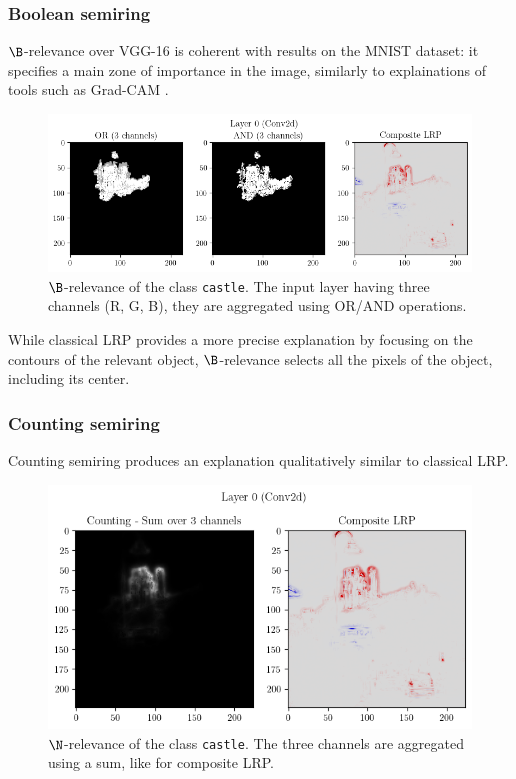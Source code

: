 \documentclass{../cs-classes/cs-classes}
\newcommand*{\1}{\digitsbb{1}}
\newcommand*{\0}{\digitsbb{0}}
\begin{document}
\subsubsection{Boolean semiring}
$\B$-relevance over VGG-16 is coherent with results on the MNIST dataset: it specifies a main zone of importance in the image, similarly to explainations of tools such as Grad-CAM \cite{gradcam}.
\begin{figure}[H]
    \centering
    \includegraphics[width=.9\textwidth]{vgg-boolean.png}
    \caption{$\B$-relevance of the class \texttt{castle}. The input layer having three channels (R, G, B), they are aggregated using OR/AND operations.}
    \label{fig:vgg-boolean}
\end{figure}
While classical LRP provides a more precise explanation by focusing on the contours of the relevant object, $\B$-relevance selects all the pixels of the object, including its center.

\subsubsection{Counting semiring}
Counting semiring produces an explanation qualitatively similar to classical LRP. 
\begin{figure}[H]
    \centering
    \includegraphics[width=.65\textwidth]{vgg-counting.png}
    \caption{$\N$-relevance of the class \texttt{castle}. The three channels are aggregated\\ using a sum, like for composite LRP.}
\end{figure}
\end{document}
